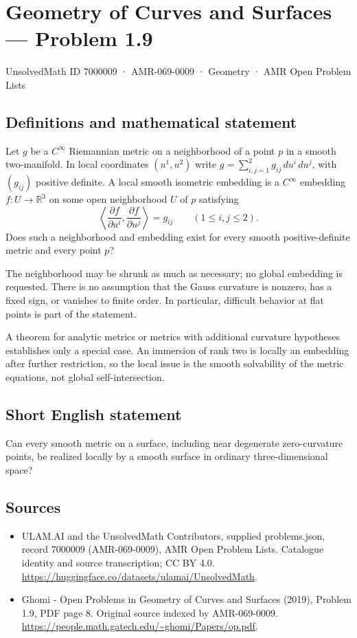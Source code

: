 \documentclass[11pt,a4paper]{article}
\begin{document}
\section*{Geometry of Curves and Surfaces — Problem 1.9}\label{7000009}
{\small UnsolvedMath ID 7000009 · AMR-069-0009 · Geometry · AMR Open Problem Lists}
\subsection{Definitions and mathematical statement}
Let $g$ be a $C^\infty$ Riemannian metric on a neighborhood of
a point $p$ in a smooth two-manifold. In local coordinates
$(u^1,u^2)$ write $g=\sum_{i,j=1}^2g_{ij}\,du^i\,du^j$, with
$(g_{ij})$ positive definite. A local smooth isometric embedding
is a $C^\infty$ embedding $f:U\to\mathbb R^3$ on some open
neighborhood $U$ of $p$ satisfying
\[
        \left\langle\frac{\partial f}{\partial u^i},
                       \frac{\partial f}{\partial u^j}\right\rangle
                         =g_{ij}\qquad(1\le i,j\le2).
\]
Does such a neighborhood and embedding exist for every smooth
positive-definite metric and every point $p$?

The neighborhood may be shrunk as much as necessary; no global
embedding is requested. There is no assumption that the Gauss
curvature is nonzero, has a fixed sign, or vanishes to finite
order. In particular, difficult behavior at flat points is part
of the statement.

A theorem for analytic metrics or metrics with additional
curvature hypotheses establishes only a special case. An
immersion of rank two is locally an embedding after further
restriction, so the local issue is the smooth solvability of
the metric equations, not global self-intersection.
\subsection{Short English statement}
Can every smooth metric on a surface, including near degenerate
zero-curvature points, be realized locally by a smooth surface
in ordinary three-dimensional space?
\subsection{Sources}
\begin{itemize}
\item[S1] ULAM.AI and the UnsolvedMath Contributors, supplied problems.json, record 7000009 (AMR-069-0009), AMR Open Problem Lists. Catalogue identity and source transcription; CC BY 4.0.
\url{https://huggingface.co/datasets/ulamai/UnsolvedMath}.
\item[S2] Ghomi - Open Problems in Geometry of Curves and Surfaces (2019), Problem 1.9, PDF page 8. Original source indexed by AMR-069-0009.
\url{https://people.math.gatech.edu/~ghomi/Papers/op.pdf}.
\end{itemize}
\end{document}
